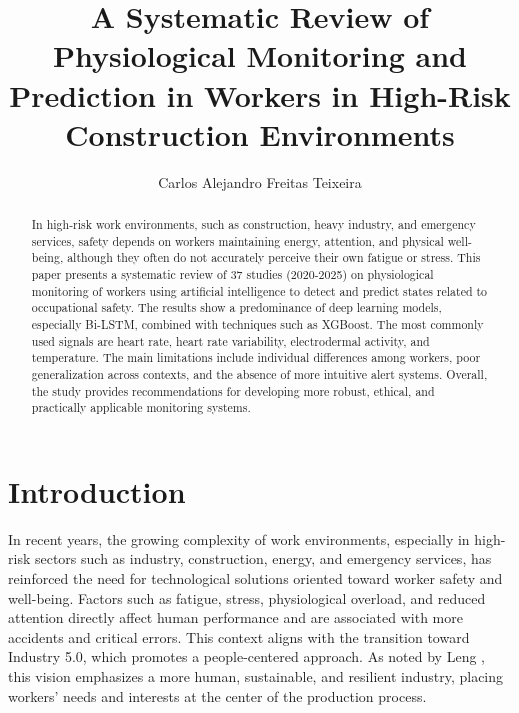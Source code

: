 \documentclass[runningheads]{llncs}
\begin{document}
%
\title{A Systematic Review of Physiological Monitoring and Prediction in Workers in High-Risk Construction Environments}
%
%
\author{Carlos Alejandro Freitas Teixeira}
%
%
%
\maketitle              %
%
\begin{abstract}

In high-risk work environments, such as construction, heavy industry, and emergency services, safety depends on workers maintaining energy, attention, and physical well-being, although they often do not accurately perceive their own fatigue or stress. This paper presents a systematic review of 37 studies (2020-2025) on physiological monitoring of workers using artificial intelligence to detect and predict states related to occupational safety. The results show a predominance of deep learning models, especially Bi-LSTM, combined with techniques such as XGBoost. The most commonly used signals are heart rate, heart rate variability, electrodermal activity, and temperature. The main limitations include individual differences among workers, poor generalization across contexts, and the absence of more intuitive alert systems. Overall, the study provides recommendations for developing more robust, ethical, and practically applicable monitoring systems.

\end{abstract}
%
%
%
\section{Introduction}

In recent years, the growing complexity of work environments, especially in high-risk sectors such as industry, construction, energy, and emergency services, has reinforced the need for technological solutions oriented toward worker safety and well-being. Factors such as fatigue, stress, physiological overload, and reduced attention directly affect human performance and are associated with more accidents and critical errors. This context aligns with the transition toward Industry 5.0, which promotes a people-centered approach. As noted by Leng \cite{leng2024}, this vision emphasizes a more human, sustainable, and resilient industry, placing workers' needs and interests at the center of the production process.
\end{document}
